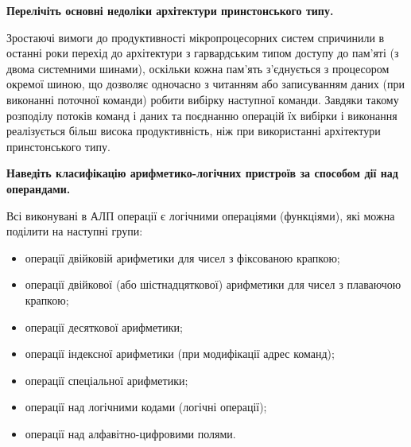 \documentclass[a4paper,14pt]{extreport}
\begin{document}
\begin{tcolorbox}[colback=red!5!white!100,colframe=red!75!black!90,width=19cm,righttitle=0.5cm,
title= \center{\Large{\textbf{3}}}]
\begin{center}\bf{Перелічіть основні недоліки архітектури принстонського типу.}\end{center}
\tcblower
Зростаючі вимоги до продуктивності мікропроцесорних систем спричинили в останні роки перехід до архітектури з гарвардським типом доступу до пам'яті (з двома системними шинами), оскільки кожна пам'ять з'єднується з процесором окремої шиною, що
дозволяє одночасно з читанням або записуванням даних (при виконанні поточної команди) робити вибірку наступної команди. Завдяки такому розподілу потоків команд і даних та поєднанню операцій їх вибірки і виконання реалізується більш висока продуктивність, ніж при використанні архітектури
принстонського типу.
\end{tcolorbox}


\begin{tcolorbox}[colback=green!5!white!100,colframe=green!75!black!90,width=19cm,righttitle=0.5cm,
title= \center{\Large{\textbf{4}}}]
\begin{center}\bf{Наведіть класифікацію арифметико-логічних пристроїв за способом дії
над операндами.}\end{center}
\tcblower
Всі виконувані в АЛП операції є логічними операціями (функціями),
які можна поділити на наступні групи:
\begin{itemize}
\item операції двійковій арифметики для чисел з фіксованою крапкою;
\item операції двійкової (або шістнадцяткової) арифметики для чисел з
плаваючою крапкою;
\item операції десяткової арифметики;
\item операції індексної арифметики (при модифікації адрес команд);
\item операції спеціальної арифметики;
\item операції над логічними кодами (логічні операції);
\item операції над алфавітно-цифровими полями.
\end{itemize}
\end{tcolorbox}
\end{document}

